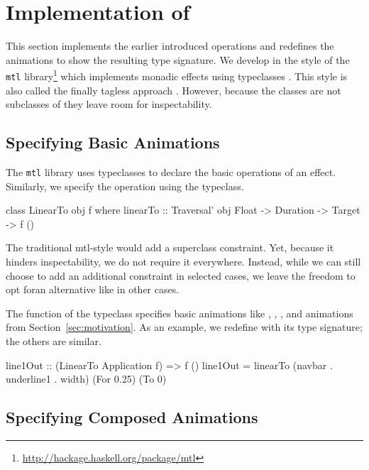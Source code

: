 \section{Implementation of \dsl{}}
\label{sec:detail}

This section implements the earlier introduced operations and redefines the animations to show the resulting type signature. We
develop \dsl{} in the style of the \texttt{mtl}
library\footnote{\url{http://hackage.haskell.org/package/mtl}} which implements
monadic effects using typeclasses \cite{DBLP:conf/afp/Jones95}.  This style is
also called the finally tagless approach \cite{DBLP:journals/jfp/CaretteKS09}.
However, because the \dsl{} classes are not subclasses of  they leave
room for inspectability.

\subsection{Specifying Basic Animations}

The \texttt{mtl} library uses typeclasses to declare the basic operations of an
effect. Similarly, we specify the  operation using
the  typeclass.

\begin{code}
class LinearTo obj f where
  linearTo :: Traversal' obj Float -> Duration -> Target -> f ()
\end{code}

The traditional mtl-style would add a  superclass constraint. Yet,
because it hinders inspectability, we do not require it everywhere. Instead,
while we can still choose to add an additional  constraint in selected
cases, we leave the freedom to opt foran alternative like  in
other cases.

The  function of the  typeclass specifies basic
animations like , ,
, and  animations from
Section~\ref{sec:motivation}. 
As an example, we redefine  with its type signature; the others 
are similar. 

\begin{code}
line1Out :: (LinearTo Application f) => f ()
line1Out = linearTo (navbar . underline1 . width) (For 0.25) (To 0)
\end{code}

\subsection{Specifying Composed Animations}

